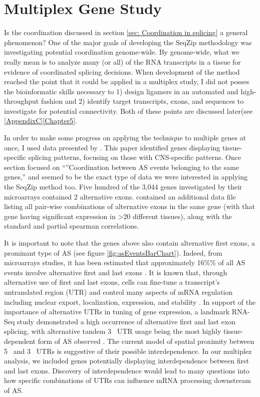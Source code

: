 \section{Multiplex Gene Study}\label{sec: Multiplex Gene Study}

Is the coordination discussed in section \ref{sec: Coordination in splicing} a general phenomenon? One of the major goals of developing the SeqZip methodology was investigating potential coordination genome-wide. By genome-wide, what we really mean is to analyze many (or all) of the RNA transcripts in a tissue for evidence of coordinated splicing decisions. When development of the method reached the point that it could be applied in a multiplex study, I did not posses the bioinformatic skills necessary to 1) design ligamers in an automated and high-throughput fashion and 2) identify target transcripts, exons, and sequences to investigate for potential connectivity. Both of these points are discussed later(see \ref{AppendixC}\ref{Chapter5}. 

In order to make some progress on applying the technique to multiple genes at once, I used data presented by \citet{Fagnani2007}. This paper identified genes displaying tissue-specific splicing patterns, focusing on those with CNS-specific patterns. Once section focused on ``''Coordination between AS events belonging to the same genes,'' and seemed to be the exact type of data we were interested in applying the SeqZip method too. Five hundred of the 3,044 genes investigated by their microarrays contained 2 alternative exons. \citet{Fagnani2007} contained an additional data file listing all pair-wise combinations of alternative exons in the same gene (with that gene having significant expression in >20 different tissues), along with the standard and partial spearman correlations. 

It is important to note that the genes above also contain alternative first exons, a prominant type of AS (see figure \ref{fig:asEventsBarChart}). Indeed, from microarrays studies, it has been estimated that approximately 16\%\% of all AS events involve alternative first and last exons \citep{Bingham2008a}. It is known that, through alternative use of first and last exons, cells can fine-tune a transcript’s untranslated region (UTR) and control many aspects of mRNA regulation including nuclear export, localization, expression, and stability \citep{Hughes2006}. In support of the importance of alternative UTRs in tuning of gene expression, a landmark RNA-Seq study demonstrated a high occurrence of alternative first and last exon splicing, with alternative tandem 3\textprime~ UTR usage being the most highly tissue-dependent form of AS observed \citep{Wang2008}. The current model of spatial proximity between 5\textprime~ and 3\textprime~ UTRs is suggestive of their possible interdependence. In our multiplez analysis, we included genes potentially displaying interdependence between first and last exons. Discovery of interdependence would lead to many questions into how specific combinations of UTRs can influence mRNA processing downstream of AS.

